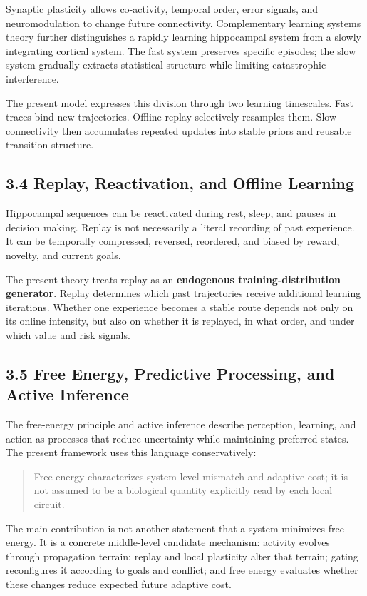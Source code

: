 \documentclass[11pt, a4paper]{article}
\begin{document}
Synaptic plasticity allows co-activity, temporal order, error signals, and neuromodulation to change future connectivity. Complementary learning systems theory further distinguishes a rapidly learning hippocampal system from a slowly integrating cortical system. The fast system preserves specific episodes; the slow system gradually extracts statistical structure while limiting catastrophic interference.

The present model expresses this division through two learning timescales. Fast traces bind new trajectories. Offline replay selectively resamples them. Slow connectivity then accumulates repeated updates into stable priors and reusable transition structure.

\subsection{3.4 Replay, Reactivation, and Offline Learning}

Hippocampal sequences can be reactivated during rest, sleep, and pauses in decision making. Replay is not necessarily a literal recording of past experience. It can be temporally compressed, reversed, reordered, and biased by reward, novelty, and current goals.

The present theory treats replay as an \textbf{endogenous training-distribution generator}. Replay determines which past trajectories receive additional learning iterations. Whether one experience becomes a stable route depends not only on its online intensity, but also on whether it is replayed, in what order, and under which value and risk signals.

\subsection{3.5 Free Energy, Predictive Processing, and Active Inference}

The free-energy principle and active inference describe perception, learning, and action as processes that reduce uncertainty while maintaining preferred states. The present framework uses this language conservatively:

\begin{quote}
Free energy characterizes system-level mismatch and adaptive cost; it is not assumed to be a biological quantity explicitly read by each local circuit.
\end{quote}

The main contribution is not another statement that a system minimizes free energy. It is a concrete middle-level candidate mechanism: activity evolves through propagation terrain; replay and local plasticity alter that terrain; gating reconfigures it according to goals and conflict; and free energy evaluates whether these changes reduce expected future adaptive cost.
\end{document}
